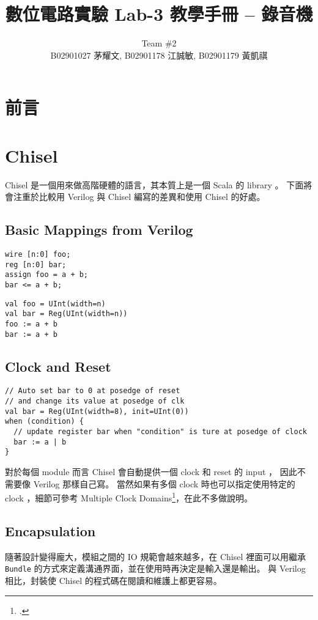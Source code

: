 \documentclass[12pt, a4paper]{article}
\title{數位電路實驗 Lab-3 教學手冊 -- 錄音機 \vspace{-0.2cm}}
\author{Team \#2 \\ B02901027 茅耀文, B02901178 江誠敏, B02901179 黃凱祺}
\begin{document}
\maketitle

\setcounter{section}{-1}
\section{前言}

\section{Chisel}
Chisel 是一個用來做高階硬體的語言，其本質上是一個 Scala 的 library 。
下面將會注重於比較用 Verilog 與 Chisel 編寫的差異和使用 Chisel 的好處。

\subsection{Basic Mappings from Verilog}
\hspace{2em}
\begin{minipage}{0.4\textwidth}
  \begin{verbatim}
wire [n:0] foo;
reg [n:0] bar;
assign foo = a + b;
bar <= a + b;
  \end{verbatim}
\end{minipage}
\hspace{2em}
\begin{minipage}{0.4\textwidth}
  \begin{verbatim}
val foo = UInt(width=n)
val bar = Reg(UInt(width=n))
foo := a + b
bar := a + b
  \end{verbatim}
\end{minipage}
\subsection{Clock and Reset}
\begin{verbatim}
// Auto set bar to 0 at posedge of reset
// and change its value at posedge of clk
val bar = Reg(UInt(width=8), init=UInt(0))
when (condition) {
  // update register bar when "condition" is ture at posedge of clock
  bar := a | b
}
\end{verbatim}
對於每個 module 而言 Chisel 會自動提供一個 clock 和 reset 的 input ，
因此不需要像 Verilog 那樣自己寫。
當然如果有多個 clock 時也可以指定使用特定的 clock ，細節可參考
Multiple Clock Domains\footcite{chisel:multi-clock}，在此不多做說明。
\subsection{Encapsulation}
隨著設計變得龐大，模組之間的 IO 規範會越來越多，在 Chisel 裡面可以用繼承
{\tt Bundle} 的方式來定義溝通界面，並在使用時再決定是輸入還是輸出。
與 Verilog 相比，封裝使 Chisel 的程式碼在閱讀和維護上都更容易。
\end{document}
